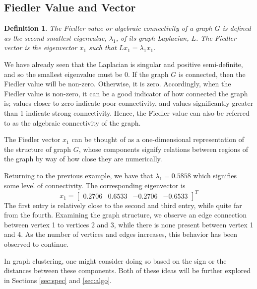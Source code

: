 \documentclass[11pt, letterpaper]{article}
\theoremstyle{perchance}
\newtheorem*{definition}{Definition}
\begin{document}
    \subsection{Fiedler Value and Vector}
    
        \begin{definition}
            The \emph{Fiedler value} or \emph{algebraic connectivity} \cite{bennett, wikialgcon} of a graph $G$ is defined as the second smallest eigenvalue, $\lambda_1$, of its graph Laplacian, $L$. The \emph{Fiedler vector} is the eigenvector $x_1$ such that $Lx_1 = \lambda_1x_1$.
        \end{definition}
    
        \vspace{-3.5mm}    
        
        We have already seen that the Laplacian is singular and positive semi-definite, and so the smallest eigenvalue must be 0. If the graph $G$ is connected, then the Fiedler value will be non-zero. Otherwise, it is zero. Accordingly, when the Fiedler value is non-zero, it can be a good indicator of how connected the graph is; values closer to zero indicate poor connectivity, and values significantly greater than 1 indicate strong connectivity. Hence, the Fiedler value can also be referred to as the algebraic connectivity of the graph.
    
        The Fiedler vector $x_1$ can be thought of as a one-dimensional representation of the structure of graph $G$, whose components signify relations between regions of the graph by way of how close they are numerically.
    
        Returning to the previous example, we have that $\lambda_1 = 0.5858$ which signifies some level of connectivity. The corresponding eigenvector is
        \[x_1 = \begin{bmatrix}
            0.2706 & 0.6533 & -0.2706 & -0.6533
        \end{bmatrix}^T\]
        The first entry is relatively close to the second and third entry, while quite far from the fourth. Examining the graph structure, we observe an edge connection between vertex 1 to vertices 2 and 3, while there is none present between vertex 1 and 4. As the number of vertices and edges increases, this behavior has been observed to continue.
    
        In graph clustering, one might consider doing so based on the sign or the distances between these components. Both of these ideas will be further explored in Sections \ref{sec:spec} and \ref{sec:algo}.
\end{document}
